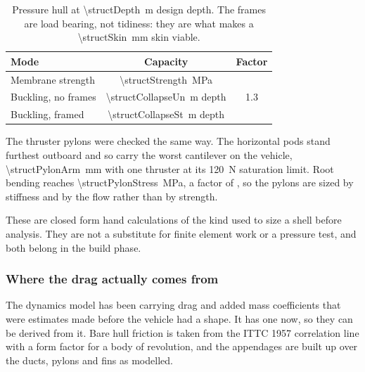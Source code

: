 \documentclass[10pt,a4paper]{article}
\begin{document}
\begin{table}[htbp]\centering\small
\caption{Pressure hull at \SI{\structDepth}{\metre} design depth. The frames
are load bearing, not tidiness: they are what makes a
\SI{\structSkin}{\milli\metre} skin viable.}
\begin{tabular}{lcc}
\toprule
\textbf{Mode} & \textbf{Capacity} & \textbf{Factor} \\
\midrule
Membrane strength & \SI{\structStrength}{\mega\pascal} & \structSfYield{} \\
Buckling, no frames & \SI{\structCollapseUn}{\metre} depth &
\num{1.3} \\
Buckling, framed & \SI{\structCollapseSt}{\metre} depth & \structSfBuckle{} \\
\bottomrule
\end{tabular}
\end{table}

The thruster pylons were checked the same way. The horizontal pods stand
furthest outboard and so carry the worst cantilever on the vehicle,
\SI{\structPylonArm}{\milli\metre} with one thruster at its
\SI{120}{\newton} saturation limit. Root bending reaches
\SI{\structPylonStress}{\mega\pascal}, a factor of \structPylonSf{}, so the
pylons are sized by stiffness and by the flow rather than by strength.

These are closed form hand calculations of the kind used to size a shell before
analysis. They are not a substitute for finite element work or a pressure test,
and both belong in the build phase.

\subsubsection{Where the drag actually comes from}

The dynamics model has been carrying drag and added mass coefficients that were
estimates made before the vehicle had a shape. It has one now, so they can be
derived from it. Bare hull friction is taken from the ITTC 1957 correlation
line with a form factor for a body of revolution, and the appendages are built
up over the ducts, pylons and fins as modelled.
\end{document}
